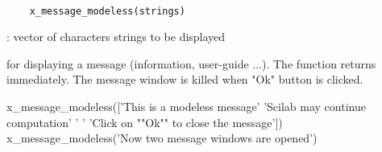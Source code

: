
\begin{mandesc}
  \\ %
\end{mandesc}
\label{x-message-modeless}
\begin{calling_sequence}
  \begin{verbatim}
    x_message_modeless(strings)   
  \end{verbatim}
\end{calling_sequence}
\begin{parameters}
  \begin{varlist}
     : vector of characters strings to be displayed
  \end{varlist}
\end{parameters}
\begin{mandescription}
  for displaying a message (information, user-guide ...). The function
  returns immediately. The message window is killed when "Ok" button is
  clicked.
\end{mandescription}
\begin{examples}
  \begin{program}
    x_message_modeless(['This is a modeless message'
      'Scilab may continue computation'
      ' '
      'Click on ""Ok"" to close the message'])
    x_message_modeless('Now two message windows are opened')
  \end{program}
\end{examples}
\begin{manseealso}
      
\end{manseealso}

